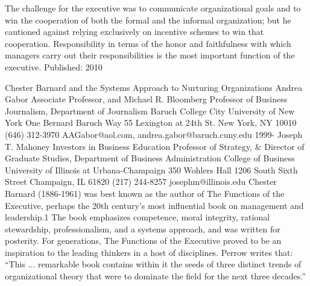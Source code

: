 The challenge for the executive was to communicate organizational goals and to win the cooperation of both the formal and the informal organization; but he cautioned against relying exclusively on incentive schemes to win that cooperation. Responsibility in terms of the honor and faithfulness with which managers carry out their responsibilities is the most important function of the executive. Published: 2010

Chester Barnard and the Systems Approach to Nurturing Organizations Andrea Gabor Associate Professor, and Michael R. Bloomberg Professor of Business Journalism, Department of Journalism Baruch College City University of New York One Bernard Baruch Way 55 Lexington at 24th St. New York, NY 10010 (646) 312-3970 AAGabor@aol.com, andrea.gabor@baruch.cuny.edu 1999- Joseph T. Mahoney Investors in Business Education Professor of Strategy, \& Director of Graduate Studies, Department of Business Administration College of Business University of Illinois at Urbana-Champaign 350 Wohlers Hall 1206 South Sixth Street Champaign, IL 61820 (217) 244-8257 josephm@illinois.edu Chester Barnard (1886-1961) was best known as the author of The Functions of the Executive, perhaps the 20th century’s most influential book on management and leadership.1 The book emphasizes competence, moral integrity, rational stewardship, professionalism, and a systems approach, and was written for posterity. For generations, The Functions of the Executive proved to be an inspiration to the leading thinkers in a host of disciplines. Perrow writes that: ``This ... remarkable book contains within it the seeds of three distinct trends of organizational theory that were to dominate the field for the next three decades.''

